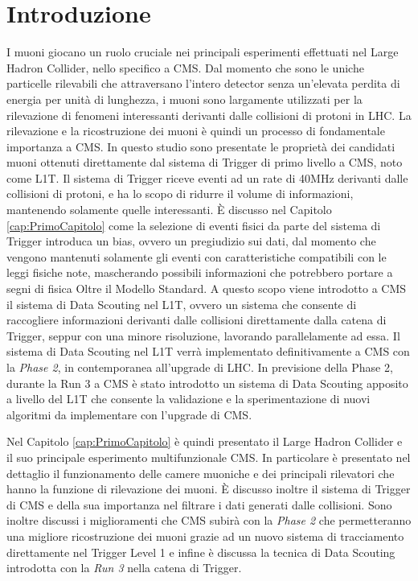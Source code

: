 \chapter{Introduzione}
\label{cap:Introduzione}

I muoni giocano un ruolo cruciale nei principali esperimenti effettuati nel Large Hadron Collider, nello specifico a CMS. Dal momento che sono le uniche particelle rilevabili che attraversano l'intero detector senza un'elevata perdita di energia per unità di lunghezza, i muoni sono largamente utilizzati per la rilevazione di fenomeni interessanti derivanti dalle collisioni di protoni in LHC. La rilevazione e la ricostruzione dei muoni è quindi un processo di fondamentale importanza a CMS.\newline
In questo studio sono presentate le proprietà dei candidati muoni ottenuti direttamente dal sistema di Trigger di primo livello a CMS, noto come L1T. Il sistema di Trigger riceve eventi ad un rate di 40MHz derivanti dalle collisioni di protoni, e ha lo scopo di ridurre il volume di informazioni, mantenendo solamente quelle interessanti.
È discusso nel Capitolo \ref{cap:PrimoCapitolo} come la selezione di eventi fisici da parte del sistema di Trigger introduca un bias, ovvero un pregiudizio sui dati, dal momento che vengono mantenuti solamente gli eventi con caratteristiche compatibili con le leggi fisiche note, mascherando possibili informazioni che potrebbero portare a segni di fisica Oltre il Modello Standard. A questo scopo viene introdotto a CMS il sistema di Data Scouting nel L1T, ovvero un sistema che consente di raccogliere informazioni derivanti dalle collisioni direttamente dalla catena di Trigger, seppur con una minore risoluzione, lavorando parallelamente ad essa. Il sistema di Data Scouting nel L1T verrà implementato definitivamente a CMS con la \textit{Phase 2}, in contemporanea all'upgrade di LHC. In previsione della Phase 2, durante la Run 3 a CMS è stato introdotto un sistema di Data Scouting apposito a livello del L1T che consente la validazione e la sperimentazione di nuovi algoritmi da implementare con l'upgrade di CMS.

Nel Capitolo \ref{cap:PrimoCapitolo} è quindi presentato il Large Hadron Collider e il suo principale esperimento multifunzionale CMS. In particolare è presentato nel dettaglio il funzionamento delle camere muoniche e dei principali rilevatori che hanno la funzione di rilevazione dei muoni. È discusso inoltre il sistema di Trigger di CMS e della sua importanza nel filtrare i dati generati dalle collisioni. Sono inoltre discussi i miglioramenti che CMS subirà con la \textit{Phase 2} che permetteranno una migliore ricostruzione dei muoni grazie ad un nuovo sistema di tracciamento direttamente nel Trigger Level 1 e infine è discussa la tecnica di Data Scouting introdotta con la \textit{Run 3} nella catena di Trigger.

